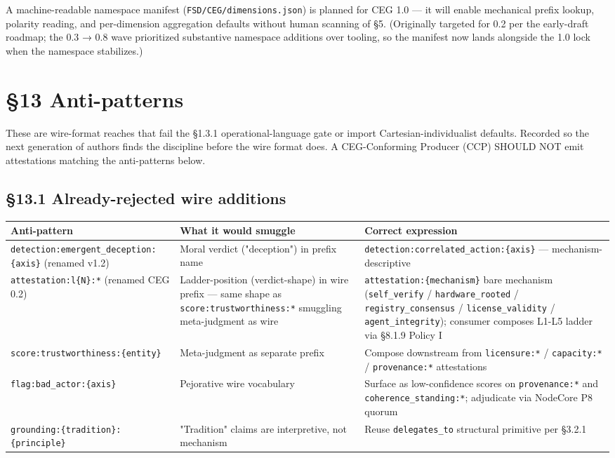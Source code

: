 \documentclass[10pt]{article}
\begin{document}
A machine-readable namespace manifest (\texttt{FSD/CEG/dimensions.json}) is planned for CEG 1.0 — it will enable mechanical prefix lookup, polarity reading, and per-dimension aggregation defaults without human scanning of §5. (Originally targeted for 0.2 per the early-draft roadmap; the 0.3 → 0.8 wave prioritized substantive namespace additions over tooling, so the manifest now lands alongside the 1.0 lock when the namespace stabilizes.)




\clearpage


\section*{§13 Anti-patterns}


These are wire-format reaches that fail the §1.3.1 operational-language gate or import Cartesian-individualist defaults. Recorded so the next generation of authors finds the discipline before the wire format does. A CEG-Conforming Producer (CCP) SHOULD NOT emit attestations matching the anti-patterns below.


\subsection*{§13.1 Already-rejected wire additions}


{\footnotesize
\begin{longtable}{|p{5.33cm}|p{5.33cm}|p{5.33cm}|}\hline
\textbf{Anti-pattern} & \textbf{What it would smuggle} & \textbf{Correct expression} \\ \hline\endhead
\texttt{detection:emergent\_deception:\{axis\}} (renamed v1.2) & Moral verdict ("deception") in prefix name & \texttt{detection:correlated\_action:\{axis\}} — mechanism-descriptive \\ \hline
\texttt{attestation:l\{N\}:*} (renamed CEG 0.2) & Ladder-position (verdict-shape) in wire prefix — same shape as \texttt{score:trustworthiness:*} smuggling meta-judgment as wire & \texttt{attestation:\{mechanism\}} bare mechanism (\texttt{self\_verify} / \texttt{hardware\_rooted} / \texttt{registry\_consensus} / \texttt{license\_validity} / \texttt{agent\_integrity}); consumer composes L1-L5 ladder via §8.1.9 Policy I \\ \hline
\texttt{score:trustworthiness:\{entity\}} & Meta-judgment as separate prefix & Compose downstream from \texttt{licensure:*} / \texttt{capacity:*} / \texttt{provenance:*} attestations \\ \hline
\texttt{flag:bad\_actor:\{axis\}} & Pejorative wire vocabulary & Surface as low-confidence scores on \texttt{provenance:*} and \texttt{coherence\_standing:*}; adjudicate via NodeCore P8 quorum \\ \hline
\texttt{grounding:\{tradition\}:\{principle\}} & "Tradition" claims are interpretive, not mechanism & Reuse \texttt{delegates\_to} structural primitive per §3.2.1 \\ \hline
\end{longtable}}
\end{document}
